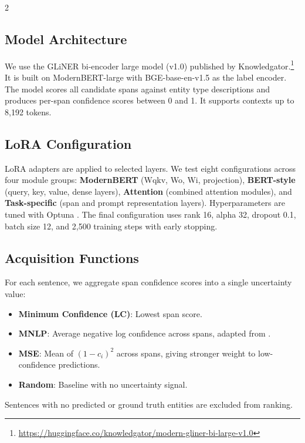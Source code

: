 \documentclass[11pt]{article}
\begin{document}
\begin{multicols}{2}
\subsection{Model Architecture}

We use the GLiNER bi-encoder large model (v1.0) published by Knowledgator.\footnote{\url{https://huggingface.co/knowledgator/modern-gliner-bi-large-v1.0}} It is built on ModernBERT-large with BGE-base-en-v1.5 as the label encoder. The model scores all candidate spans against entity type descriptions and produces per-span confidence scores between 0 and 1. It supports contexts up to 8{,}192 tokens.

\subsection{LoRA Configuration}

LoRA adapters are applied to selected layers. We test eight configurations across four module groups: \textbf{ModernBERT} (Wqkv, Wo, Wi, projection), \textbf{BERT-style} (query, key, value, dense layers), \textbf{Attention} (combined attention modules), and \textbf{Task-specific} (span and prompt representation layers). Hyperparameters are tuned with Optuna \citep{akiba2019optuna}. The final configuration uses rank 16, alpha 32, dropout 0.1, batch size 12, and 2{,}500 training steps with early stopping.

\subsection{Acquisition Functions}

For each sentence, we aggregate span confidence scores into a single uncertainty value:

\begin{itemize}[leftmargin=*, nosep, itemsep=2pt]
    \item \textbf{Minimum Confidence (LC)}: Lowest span score.
    \item \textbf{MNLP}: Average negative log confidence across spans, adapted from \citet{shen2017deep}.
    \item \textbf{MSE}: Mean of $(1 - c_i)^2$ across spans, giving stronger weight to low-confidence predictions.
    \item \textbf{Random}: Baseline with no uncertainty signal.
\end{itemize}

Sentences with no predicted or ground truth entities are excluded from ranking.


\end{multicols}
\end{document}
